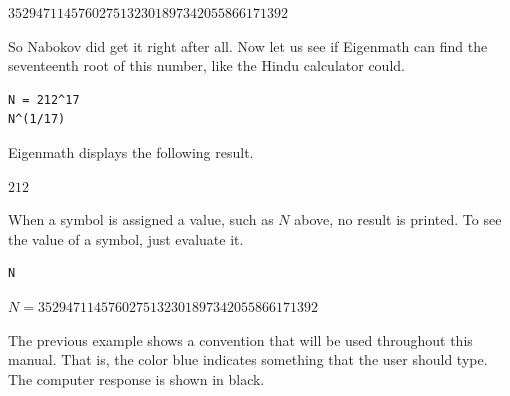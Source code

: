 $3529471145760275132301897342055866171392$

So Nabokov did get it right after all.
Now let us see if Eigenmath can find the
seventeenth root of this number, like the Hindu calculator could.

\begin{Verbatim}[formatcom=\color{blue}]
N = 212^17
N^(1/17)
\end{Verbatim}

Eigenmath displays the following result.

$212$

When a symbol is assigned a value, such as $N$ above,
no result is printed.
To see the value of a symbol, just evaluate it.

\begin{Verbatim}[formatcom=\color{blue}]
N
\end{Verbatim}

$N=3529471145760275132301897342055866171392$

The previous example shows a convention that will be used throughout
this manual.
That is, the color blue indicates something that the user should type.
The computer response is shown in black.
